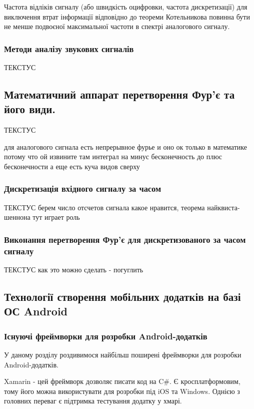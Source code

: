 Частота відліків сигналу (або швидкість оцифровки, частота дискретизації) для виключення втрат інформації відповідно до теореми Котельникова повинна бути не менше подвоєної максимальної частоти в спектрі аналогового сигналу.
\cite{панфилов1991теория}

\subsubsection{Методи аналізу звукових сигналів}

ТЕКСТУС

\subsection{Математичний аппарат перетворення Фур'є та його види.}

ТЕКСТУС

для аналогового сигнала есть непрерывное фурье и оно ок только в математике потому что ой извините там интеграл на минус бесконечность до плюс бесконечности
а еще есть куча видов сверху

\subsubsection{Дискретизація вхідного сигналу за часом}

ТЕКСТУС
берем число отсчетов сигнала какое нравится, теорема найквиста-шеннона тут играет роль

\subsubsection{Виконання перетворення Фур'є для дискретизованого за часом сигналу}

ТЕКСТУС
как это можно сделать - погуглить


\subsection{Технології створення мобільних додатків на базі ОС Android}

\subsubsection{Існуючі фреймворки для розробки Android-додатків}

У даному розділу роздивимося найбільш поширені фреймворки для розробки Android-додатків.

Xamarin - цей фреймворк дозволяє писати код на C\#. Є кросплатформовим, тому його можна використувати для розробки під iOS та Windows. Однією з головних переваг є підтримка тестування додатку у хмарі. \cite{xamarin}


